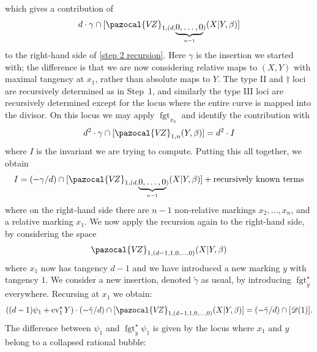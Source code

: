 \documentclass[11pt]{amsart}
\newcommand{\VZ}{\pazocal{V\!Z}}
\newcommand{\st}{\star}
\newcommand{\ev}{\operatorname{ev}}
\newcommand{\fgt}{\operatorname{fgt}}
\newcommand{\Dcal}{\mathcal{D}}
\theoremstyle{definition}
\theoremstyle{definition}
\begin{document}
which gives a contribution of
\begin{equation*} d\cdot \gamma \cap [\VZ_{1,(d,\underbrace{0,\ldots,0}_{n-1})}(X|Y,\beta)]\end{equation*}
to the right-hand side of \eqref{step 2 recursion}. Here $\gamma$ is the insertion we started with; the difference is that we are now considering relative maps to $(X,Y)$ with maximal tangency at $x_1$, rather than absolute maps to $Y$. The type II and $\dag$ loci are recursively determined as in Step~1, and similarly the type III loci are recursively determined except for the locus where the entire curve is mapped into the divisor. On this locus we may apply $\fgt_{x_0}$ and identify the contribution with
\begin{equation*} d^2 \cdot \gamma \cap [\VZ_{1,n}(Y,\beta)] = d^2 \cdot I \end{equation*}
where $I$ is the invariant we are trying to compute. Putting this all together, we obtain
\begin{equation}\label{step 2 recursion 2} I = (-\gamma/d) \cap [\VZ_{1,(d,\underbrace{0,\ldots,0}_{n-1})}(X|Y,\beta)] + \text{recursively known terms} \end{equation}
where on the right-hand side there are $n-1$ non-relative markings $x_2,\ldots,x_n$, and a relative marking $x_1$. We now apply the recursion again to the right-hand side, by considering the space
\begin{equation*} \VZ_{1,(d-1,1,0,\ldots,0)}(X|Y,\beta) \end{equation*}
where $x_1$ now has tangency $d-1$ and we have introduced a new marking $y$ with tangency $1$. We consider a new insertion, denoted $\tilde\gamma$ as usual, by introducing $\fgt_y^\st$ everywhere. Recursing at $x_1$ we obtain:
\begin{equation}\label{step 2 recursion 3} \left( (d-1)\psi_1 + \ev_1^\st Y \right)\cdot(-\tilde\gamma/d) \cap [\VZ_{1,(d-1,1,0,\ldots,0)}(X|Y,\beta)] = (-\tilde\gamma/d) \cap [\Dcal(1)].\end{equation}
The difference between $\psi_1$ and $\fgt_y^\st \psi_1$ is given by the locus where $x_1$ and $y$ belong to a collapsed rational bubble:
\end{document}
